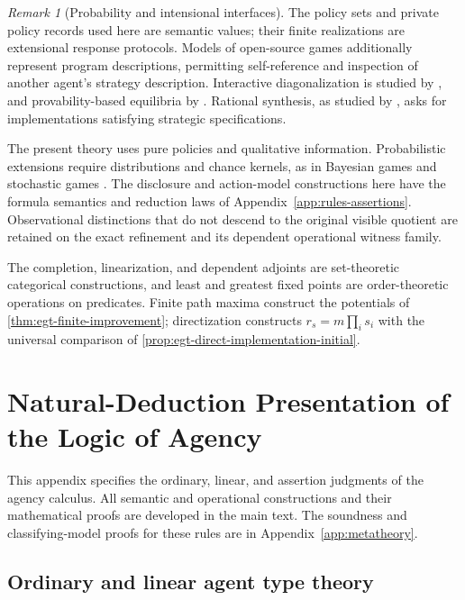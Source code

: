 \documentclass[11pt,a4paper]{article}
\numberwithin{equation}{section}
\theoremstyle{definition}
\theoremstyle{remark}
\newtheorem{remark}[theorem]{Remark}
\theoremstyle{plain}
\begin{document}
\begin{remark}[Probability and intensional interfaces]
The policy sets and private policy records used here are semantic values;
their finite realizations are extensional response protocols. Models of
open-source games additionally represent program descriptions, permitting
self-reference and inspection of another agent's strategy description.
Interactive diagonalization is studied by \citet{AbramskyZvesper2010}, and
provability-based equilibria by \citet{BaraszEtAl2014}. Rational synthesis,
as studied by \citet{FismanEtAl2009}, asks for implementations satisfying
strategic specifications.

The present theory uses pure policies and qualitative information.
Probabilistic extensions require distributions and chance kernels, as in
Bayesian games \citep{Harsanyi1967} and stochastic games
\citep{Shapley1953}. The disclosure and action-model constructions here
have the formula semantics and reduction laws of
Appendix~\ref{app:rules-assertions}. Observational distinctions that do
not descend to the original visible quotient are retained on the exact
refinement and its dependent operational witness family.

The completion, linearization, and dependent adjoints are set-theoretic
categorical constructions, and least and greatest fixed points are
order-theoretic operations on predicates. Finite path maxima construct
the potentials of \cref{thm:egt-finite-improvement}; directization constructs
$r_s=m\prod_i s_i$ with the universal comparison of
\cref{prop:egt-direct-implementation-initial}.
\end{remark}


\clearpage
\appendix

\section{Natural-Deduction Presentation of the Logic of Agency}
\label{app:rules}

This appendix specifies the ordinary, linear, and assertion judgments of
the agency calculus. All semantic and operational constructions and their
mathematical proofs are developed in the main text. The soundness and
classifying-model proofs for these rules are in
Appendix~\ref{app:metatheory}.

\subsection{Ordinary and linear agent type theory}
\label{app:rules-types}
\end{document}
